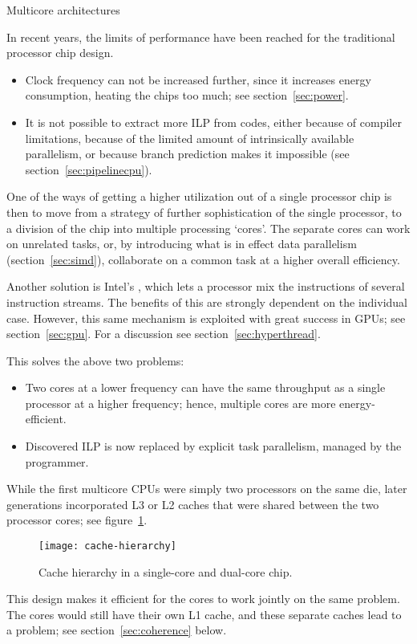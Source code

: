  {Multicore architectures}
\label{sec:multicore}

In recent years, the limits of performance have been reached for the
traditional processor chip design.
\begin{itemize}
\item Clock frequency can not be increased further, since it increases
  energy consumption, heating the chips too
  much; see section~\ref{sec:power}. 
\item It is not possible to extract more \acf{ILP}
  from codes, either because of compiler limitations, because of the
  limited amount of intrinsically available parallelism, or because
  branch prediction makes it impossible (see
  section~\ref{sec:pipelinecpu}).
\end{itemize}

One of the ways of getting a higher utilization out of a single
processor chip is then to move from a strategy of further
sophistication of the single processor, to a division of the chip into
multiple processing `cores'.
The separate cores can work on unrelated
tasks, or, by introducing what is in effect data parallelism
(section~\ref{sec:simd}), collaborate on a common task at a higher
overall efficiency\cite{Olukotun:1996:single-chip}.
\begin{remark}
Another solution is Intel's
  , which lets a processor mix the instructions of
  several instruction streams. The benefits of this are strongly
  dependent on the individual case. However, this same mechanism is
  exploited with great success in GPUs; see
  section~\ref{sec:gpu}. For a discussion see
  section~\ref{sec:hyperthread}.
\end{remark}

This solves the above two problems:
\begin{itemize}
\item Two cores at a lower frequency can have the same throughput as a
  single processor at a higher frequency; hence, multiple cores are
  more energy-efficient.
\item Discovered \ac{ILP} is now replaced by explicit task
  parallelism, managed by the programmer.
\end{itemize}

While the first multicore \acp{CPU}
were simply two processors on the same die, later generations
incorporated L3 or L2 caches that were shared between the two
processor cores; see figure~\ref{fig:core-caches}.
\begin{figure}[ht]
  \texttt{[image: cache-hierarchy]}
  \caption{Cache hierarchy in a single-core and dual-core chip.}
  \label{fig:core-caches}
\end{figure}
This design makes it efficient for the cores to work
jointly on the same problem. 
The cores would still have their own L1 cache, and these separate
caches lead to a  problem; see
section~\ref{sec:coherence} below.

